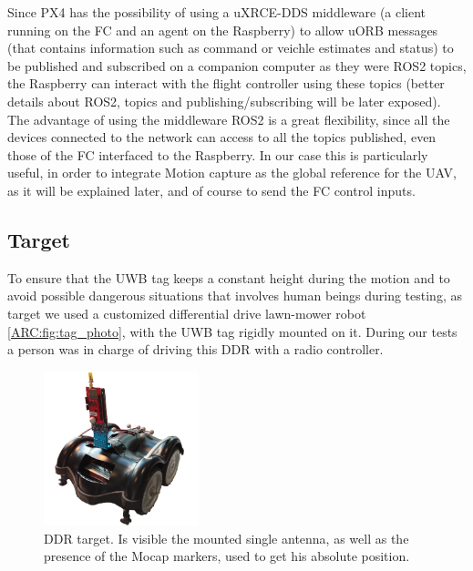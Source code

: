 Since PX4 has the possibility of using a uXRCE-DDS middleware (a client running on the FC and an agent on the Raspberry) to allow uORB messages (that contains information such as command or veichle estimates and status) to be published and subscribed on a companion computer as they were ROS2 topics, the Raspberry can interact with the flight controller using these topics (better details about ROS2, topics and publishing/subscribing will be later exposed). The advantage of using the middleware ROS2 is a great flexibility, since all the devices connected to the network can access to all the topics published, even those of the FC interfaced to the Raspberry. In our case this is particularly useful, in order to integrate Motion capture as the global reference for the UAV, as it will be explained later, and of course to send the FC control inputs.

\subsection{Target}
To ensure that the UWB tag keeps a constant height during the motion and to avoid possible dangerous situations that involves human beings during testing, as target we used a customized differential drive lawn-mower robot \autoref{ARC:fig:tag_photo}, with the UWB tag rigidly mounted on it. During our tests a person was in charge of driving this DDR with a radio controller.

\begin{figure}
    \centering
    \includegraphics[width=0.4\textwidth]{images/target_reale_tagliato.png}
    \caption{DDR target. Is visible the mounted single antenna, as well as the presence of the Mocap markers, used to get his absolute position.}
    \label{ARC:fig:tag_photo}
\end{figure}

